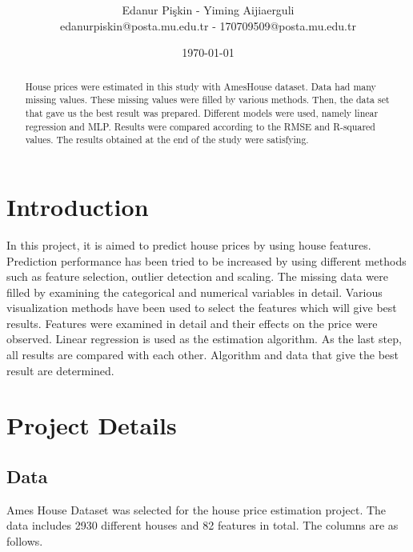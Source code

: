 \documentclass[onecolumn]{article}
\title{\spacecaps{Final Report}\\ \normalsize \spacesc{CENG 3521, Data Mining} }
\author{Edanur Pişkin - Yiming Aijiaerguli \\edanurpiskin@posta.mu.edu.tr - 170709509@posta.mu.edu.tr}
\date{\today}
\begin{document}
\maketitle

\begin{abstract}
House prices were estimated in this study with AmesHouse dataset. Data had many missing values. These missing values were filled by various methods. Then, the data set that gave us the best result was prepared. Different models were used, namely linear regression and MLP. Results were compared according to the RMSE and R-squared values. The results obtained at the end of the study were satisfying.
\end{abstract}

\section{Introduction}

In this project, it is aimed to predict house prices by using house features. Prediction performance has been tried to be increased by using different methods such as feature selection, outlier detection and scaling. The missing data were filled by examining the categorical and numerical variables in detail. Various visualization methods have been used to select the features which will give best results. Features were examined in detail and their effects on the price were observed. Linear regression is used as the estimation algorithm. As the last step, all results are compared with each other. Algorithm and data that give the best result are determined.

\section{Project Details}

\subsection{Data}

Ames House Dataset was selected for the house price estimation project. The data includes 2930 different houses and 82 features in total. The columns are as follows.
\end{document}
